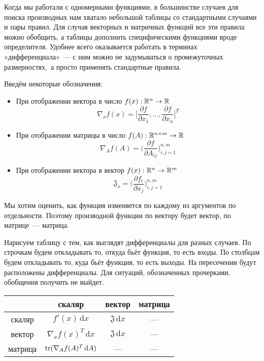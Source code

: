 \documentclass[12pt,fleqn]{article}
\newcommand{\dx}[1]{\,\mathrm{d}#1} %
\begin{document}
Когда мы работали с одномерными функциями, в большинстве случаев для поиска производных нам хватало небольшой таблицы со стандартными случаями и пары правил.
Для случая векторных и матричных функций все эти правила можно обобщить, а таблицы дополнить специфическими функциями вроде определителя.
Удобнее всего оказывается работать в терминах «дифференциала»~--- с ним можно не задумываться о промежуточных размерностях,~а просто применять стандартные правила.

Введём некоторые обозначения:
\begin{itemize}
    \item При отображении вектора в число $f(x): \mathbb{R}^n \to \mathbb{R}$ 
    \[
        \nabla_x f(x)
        =
        \bigg[
            \frac{\partial f}{\partial x_1},
            \dots,
            \frac{\partial f}{\partial x_n}
        \bigg]^T
    \]

    \item При отображении матрицы в число $f(A): \RR^{n \times m} \to \RR$
    \[
        \nabla_A f(A)
        =
        \bigg(
            \frac{\partial f}{\partial A_{ij}}
        \bigg)_{i,j=1}^{n,m}
    \]
    
    \item При отображении вектора в вектор $f(x): \mathbb{R}^n \to \mathbb{R}^m$
    \[
        \mathfrak{J}_x = \bigg(
            \frac{\partial f_{i}}{\partial x_{j}}
        \bigg)_{i,j=1}^{n,m}
    \]
\end{itemize}

Мы хотим оценить, как функция изменяется по каждому из аргументов по отдельности. Поэтому производной функции по вектору будет вектор, по матрице~--- матрица.

Нарисуем таблицу с тем, как выглядят дифференциалы для разных случаев. По строчкам будем откладывать то, откуда бьёт функция, то есть входы. По столбцам будем откладывать то, куда бьёт функция, то есть выходы. На пересечении будут расположены дифференциалы. Для ситуаций, обозначенных прочерками, обобщения получить не выйдет. 

\begin{center} 
    \begin{tabular}{|c|c|c|c|}
    \hline
        & скаляр & вектор & матрица \\
    \hline 
    скаляр & $f'(x) \dx{x}$  &  $\mathfrak{J} \dx{x}$  & ---          \\
    \hline
    вектор & $ \nabla_x f(x)^T \dx{x}$    &   $\mathfrak{J} \dx{x}$     &  ---        \\
    \hline
    матрица & $\Tr( \nabla_A f(A)^T \dx{A})$    &    ---    & ---        \\
    \hline
    \end{tabular}
\end{center} 
\end{document}
